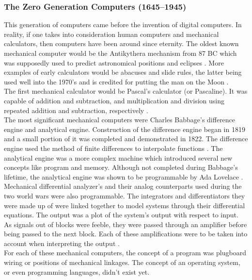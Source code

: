 \subsubsection{The Zero Generation Computers (1645--1945)}
This generation of computers came before the invention of digital computers. In reality, if one takes into consideration human computers and mechanical calculators, then computers have been around since eternity. The oldest known mechanical computer would be the Antikythera mechanism from 87 BC which was supposedly used to predict astronomical positions and eclipses \cite{ionescu2015categories}\cite{10.1115/1.2018-SEP1}. More examples of early calculators would be abacuses and slide rules, the latter being used well into the 1970's and is credited for putting the man on the Moon \cite{stoll2006slide}. \\
The first mechanical calculator would be Pascal's calculator (or Pascaline). It was capable of addition and subtraction, and multiplication and division using repeated addition and subtraction, respectively \cite{chapman1942pascal}.\\ 
The most significant mechanical computers were Charles Babbage's difference engine and analytical engine. Construction of the difference engine began in 1819 and a small portion of it was completed and demonstrated in 1822. The difference engine used the method of finite differences to interpolate functions \cite{dasgupta2014began}. The analytical engine was a more complex machine which introduced several new concepts like program and memory. Although not completed during Babbage's lifetime, the analytical engine was shown to be programmable by Ada Lovelace \cite{tannenbaum2003operating}.\\
Mechanical differential analyzer's and their analog counterparts used during the two world wars were also programmable. The integrators and differentiators they were made up of were linked together to model systems through their differential equations. The output was a plot of the system's output with respect to input. As signals out of blocks were feeble, they were passed through an amplifier before being passed to the next block. Each of these amplifications were to be taken into account when interpreting the output \cite{robinson_t_2005_918318}.\\
For each of these mechanical computers, the concept of a program was plugboard wiring or positions of mechanical linkages. The concept of an operating system, or even programming languages, didn't exist yet.

